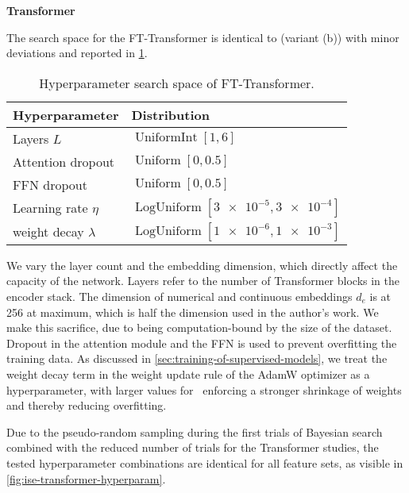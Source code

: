 \textbf{Transformer}

The search space for the FT-Transformer is identical to \textcite[][18]{gorishniyRevisitingDeepLearning2021} (variant (b)) with minor deviations and reported in \cref{tab:hyperparameter-space-2}.

\begin{table}[H]
    \centering
    \caption[Hyperparameter Search Space of FT-Transformer]{Hyperparameter search space of FT-Transformer.}
    \label{tab:hyperparameter-space-2}
    \begin{tabular}{@{}ll@{}}
        \toprule
        Hyperparameter         & Distribution                                        \\ \midrule
        Layers $L$             & $\operatorname{UniformInt}[1,6]$                    \\
        Attention dropout      & $\operatorname{Uniform}[0, 0.5]$                    \\
        \gls{FFN} dropout      & $\operatorname{Uniform}[0, 0.5]$                    \\
        Learning rate $\eta$   & $\operatorname{LogUniform}[\num{3e-5}, \num{3e-4}]$ \\
        weight decay $\lambda$ & $\operatorname{LogUniform}[\num{1e-6}, \num{1e-3}]$ \\ \bottomrule
    \end{tabular}
\end{table}

We vary the layer count and the embedding dimension, which directly affect the capacity of the network. Layers refer to the number of Transformer blocks in the encoder stack. The dimension of numerical and continuous embeddings $d_e$ is at \num{256} at maximum, which is half the dimension used in the author's work. We make this sacrifice, due to being computation-bound by the size of the dataset. Dropout \autocite[][1930]{srivastavaDropoutSimpleWay} in the attention module and the \gls{FFN} is used to prevent overfitting the training data. As discussed in \cref{sec:training-of-supervised-models}, we treat the weight decay term in the weight update rule of the AdamW optimizer as a hyperparameter, with larger values for \lambda~enforcing a stronger shrinkage of weights and thereby reducing overfitting.

Due to the pseudo-random sampling during the first trials of Bayesian search combined with the reduced number of trials for the Transformer studies, the tested hyperparameter combinations are identical for all feature sets, as visible in \cref{fig:ise-transformer-hyperparam}.

